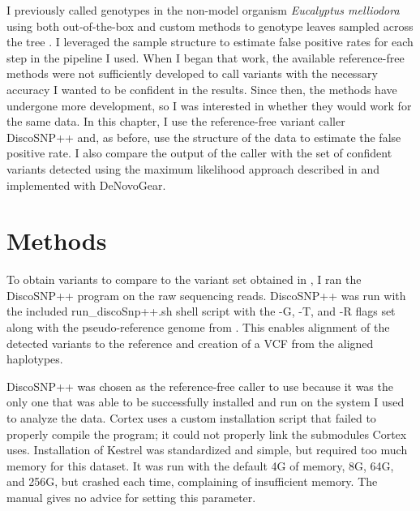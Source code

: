 I previously called genotypes in the non-model organism \textit{Eucalyptus melliodora} using both out-of-the-box and custom methods to genotype leaves sampled across the tree \parencite{orr_phylogenomic_2020}. I leveraged the sample structure to estimate false positive rates for each step in the pipeline I used. When I began that work, the available reference-free methods were not sufficiently developed to call variants with the necessary accuracy I wanted to be confident in the results. Since then, the methods have undergone more development, so I was interested in whether they would work for the same data. In this chapter, I use the reference-free variant caller DiscoSNP++ and, as before, use the structure of the data to estimate the false positive rate. I also compare the output of the caller with the set of confident variants detected using the maximum likelihood approach described in \parencite{orr_phylogenomic_2020} and implemented with DeNovoGear. %

\section{Methods}

To obtain variants to compare to the variant set obtained in \cite{orr_phylogenomic_2020}, I ran the DiscoSNP++ program on the raw sequencing reads. DiscoSNP++ was run with the included run\_discoSnp++.sh shell script with the -G, -T, and -R flags set along with the pseudo-reference genome from \cite{orr_phylogenomic_2020}. This enables alignment of the detected variants to the reference and creation of a VCF from the aligned haplotypes.

DiscoSNP++ was chosen as the reference-free caller to use because it was the only one that was able to be successfully installed and run on the system I used to analyze the data. Cortex uses a custom installation script that failed to properly compile the program; it could not properly link the submodules Cortex uses. Installation of Kestrel was standardized and simple, but required too much memory for this dataset. It was run with the default 4G of memory, 8G, 64G, and 256G, but crashed each time, complaining of insufficient memory. The manual gives no advice for setting this parameter.

